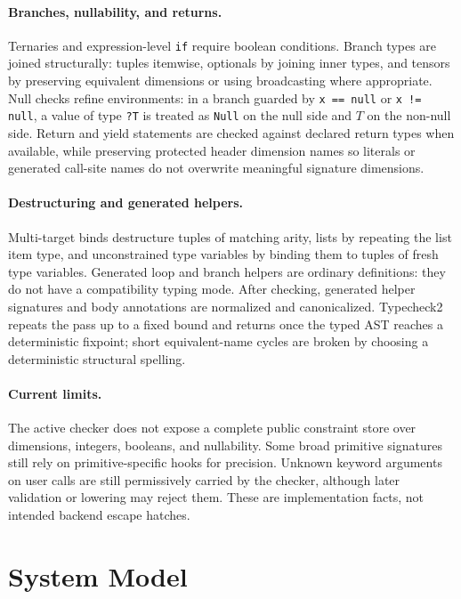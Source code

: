 \documentclass{article}
\newcommand{\code}[1]{\texttt{#1}}
\begin{document}
\paragraph{Branches, nullability, and returns.}
Ternaries and expression-level \code{if} require boolean conditions.  Branch
types are joined structurally: tuples itemwise, optionals by joining inner
types, and tensors by preserving equivalent dimensions or using broadcasting
where appropriate.  Null checks refine environments: in a branch guarded by
\code{x == null} or \code{x != null}, a value of type \code{?T} is treated as
\code{Null} on the null side and \(T\) on the non-null side.  Return and yield
statements are checked against declared return types when available, while
preserving protected header dimension names so literals or generated call-site
names do not overwrite meaningful signature dimensions.

\paragraph{Destructuring and generated helpers.}
Multi-target binds destructure tuples of matching arity, lists by repeating
the list item type, and unconstrained type variables by binding them to tuples
of fresh type variables.  Generated loop and branch helpers are ordinary
definitions: they do not have a compatibility typing mode.  After checking,
generated helper signatures and body annotations are normalized and
canonicalized.  Typecheck2 repeats the pass up to a fixed bound and returns
once the typed AST reaches a deterministic fixpoint; short equivalent-name
cycles are broken by choosing a deterministic structural spelling.

\paragraph{Current limits.}
The active checker does not expose a complete public constraint store over
dimensions, integers, booleans, and nullability.  Some broad primitive
signatures still rely on primitive-specific hooks for precision.  Unknown
keyword arguments on user calls are still permissively carried by the checker,
although later validation or lowering may reject them.  These are
implementation facts, not intended backend escape hatches.

\section{System Model}
\end{document}

